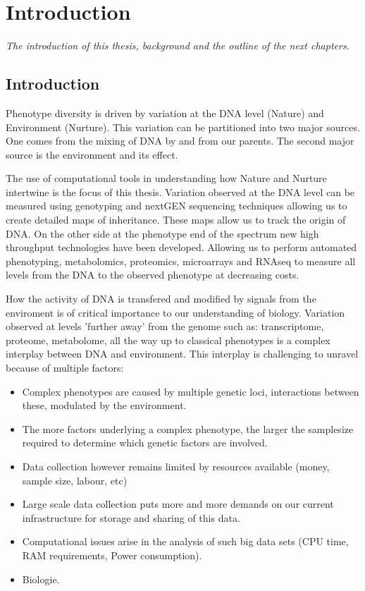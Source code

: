 \chapter{Introduction}
\emph{The introduction of this thesis, background and the outline of the next chapters.}

\null
\vfill
\newpage

\section{Introduction}

Phenotype diversity is driven by variation at the DNA level (Nature) and Environment (Nurture). 
This variation can be partitioned into two major sources. One comes from the mixing of DNA by 
and from our parents. The second major source is the environment and its effect.

The use of computational tools in understanding how Nature and Nurture intertwine is the 
focus of this thesis. Variation observed at the DNA level can be measured using genotyping 
and nextGEN sequencing techniques allowing us to create detailed maps of inheritance. These 
maps allow us to track the origin of DNA. On the other side at the phenotype end of the spectrum 
new high throughput technologies have been developed. Allowing us to perform automated 
phenotyping, metabolomics, proteomics, microarrays and RNAseq to measure all levels from the 
DNA to the observed phenotype at decreasing costs.

How the activity of DNA is transfered and modified by signals from the enviroment is of 
critical importance to our understanding of biology. Variation observed at levels 
'further away' from the genome such as: transcriptome, proteome, metabolome, all the way 
up to classical phenotypes is a complex interplay between DNA and environment. This 
interplay is challenging to unravel because of multiple factors:\\
\begin{itemize}
\item Complex phenotypes are caused by multiple genetic loci, interactions between these, 
modulated by the environment.
\item The more factors underlying a complex phenotype, the larger the samplesize required 
to determine which genetic factors are involved.
\item Data collection however remains limited by resources available (money, sample size, labour, etc)
\item Large scale data collection puts more and more demands on our current infrastructure for 
storage and sharing of this data.
\item Computational issues arise in the analysis of such big data sets (CPU time, RAM requirements, 
Power consumption).
\item Biologie.
\end{itemize}

